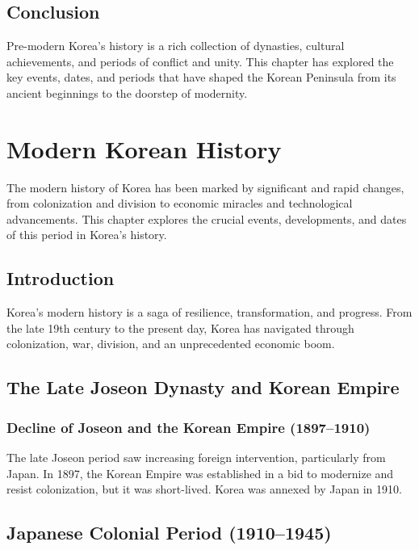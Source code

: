 \documentclass[a4paper,12pt]{book}
\begin{document}
\section{Conclusion}
\label{sec:conclusion-pre-modern-korea}
Pre-modern Korea's history is a rich collection of dynasties, cultural achievements, and periods of conflict and unity. This chapter has explored the key events, dates, and periods that have shaped the Korean Peninsula from its ancient beginnings to the doorstep of modernity.

\chapter{Modern Korean History}
\label{ch:modern-korean-history}

The modern history of Korea has been marked by significant and rapid changes, from colonization and division to economic miracles and technological advancements. This chapter explores the crucial events, developments, and dates of this period in Korea’s history.

\section{Introduction}
\label{sec:introduction-modern-korea}
Korea’s modern history is a saga of resilience, transformation, and progress. From the late 19th century to the present day, Korea has navigated through colonization, war, division, and an unprecedented economic boom.

\section{The Late Joseon Dynasty and Korean Empire}
\label{sec:late-joseon-korean-empire}

\subsection{Decline of Joseon and the Korean Empire (1897–1910)}
\label{subsec:decline-joseon-korean-empire}
The late Joseon period saw increasing foreign intervention, particularly from Japan. In 1897, the Korean Empire was established in a bid to modernize and resist colonization, but it was short-lived. Korea was annexed by Japan in 1910.

\section{Japanese Colonial Period (1910–1945)}
\label{sec:japanese-colonial-period}
\end{document}
